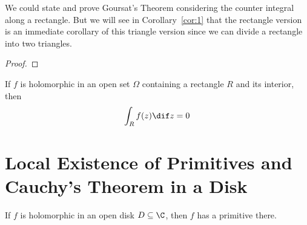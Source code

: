 \documentclass[thmcnt=section, color=cyan, 12pt]{my-elegantbook}
\begin{document}
We could state and prove Goursat's Theorem
considering the counter integral along a rectangle.
But we will see in Corollary~\ref{cor:1}
that the rectangle version is an immediate corollary of this triangle version
since we can divide a rectangle into two triangles.

\begin{proof}
\end{proof}

\begin{corollary} \label{cor:1}
    If $f$ is holomorphic in an open set $\Omega$
    containing a rectangle $R$ and its interior, then
    \begin{align*}
        \int_{R} f(z) \dif z = 0
    \end{align*}
\end{corollary}


\section{Local Existence of Primitives and Cauchy's Theorem in a Disk}

\begin{theorem}
    If $f$ is holomorphic in an open disk $D \subseteq \C$, then $f$ has a primitive there.
\end{theorem}
\end{document}
